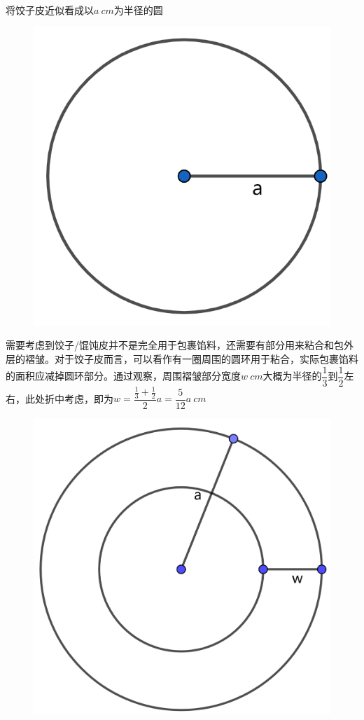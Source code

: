 \documentclass[lang=cn,a4paper]{elegantpaper}
\begin{document}
    将饺子皮近似看成以$a~cm$为半径的圆
    \begin{figure}[H]
        \centering
        \includegraphics[scale=0.4]{circle.png}
    \end{figure}
    需要考虑到饺子/馄饨皮并不是完全用于包裹馅料，还需要有部分用来粘合和包外层的褶皱。对于饺子皮而言，可以看作有一圈周围的圆环用于粘合，实际包裹馅料的面积应减掉圆环部分。通过观察，周围褶皱部分宽度$w~cm$大概为半径的$\dfrac{1}{3}$到$\dfrac{1}{2}$左右，此处折中考虑，即为$w=\dfrac{\frac{1}{3}+\frac{1}{2}}{2}a=\dfrac{5}{12}a~cm$
    \begin{figure}[H]
        \centering
        \includegraphics[scale=0.25]{circle_1.png}
    \end{figure}
    
\end{document}

